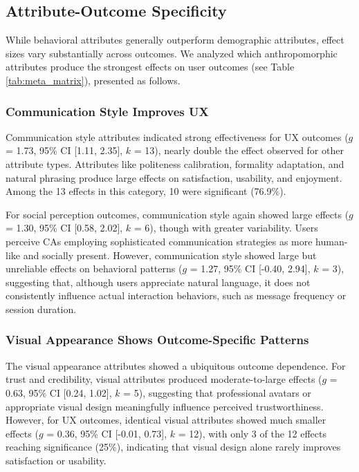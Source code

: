 \documentclass[sigconf,review,anonymous]{acmart}
\begin{document}
\subsection{Attribute-Outcome Specificity}

While behavioral attributes generally outperform demographic attributes, effect sizes vary substantially across outcomes. We analyzed which anthropomorphic attributes produce the strongest effects on user outcomes (see Table \ref{tab:meta_matrix}), presented as follows.

\subsubsection{Communication Style Improves UX}\label{sec:comm}

Communication style attributes indicated strong effectiveness for UX outcomes ($g$ = 1.73, 95\% CI [1.11, 2.35], $k$ = 13), nearly double the effect observed for other attribute types. Attributes like politeness calibration, formality adaptation, and natural phrasing produce large effects on satisfaction, usability, and enjoyment. Among the 13 effects in this category, 10 were significant (76.9\%).

For social perception outcomes, communication style again showed large effects ($g$ = 1.30, 95\% CI [0.58, 2.02], $k$ = 6), though with greater variability. Users perceive CAs employing sophisticated communication strategies as more human-like and socially present. However, communication style showed large but unreliable effects on behavioral patterns ($g$ = 1.27, 95\% CI [-0.40, 2.94], $k$ = 3), suggesting that, although users appreciate natural language, it does not consistently influence actual interaction behaviors, such as message frequency or session duration.

\subsubsection{Visual Appearance Shows Outcome-Specific Patterns}

The visual appearance attributes showed a ubiquitous outcome dependence. For trust and credibility, visual attributes produced moderate-to-large effects ($g$ = 0.63, 95\% CI [0.24, 1.02], $k$ = 5), suggesting that professional avatars or appropriate visual design meaningfully influence perceived trustworthiness. However, for UX outcomes, identical visual attributes showed much smaller effects ($g$ = 0.36, 95\% CI [-0.01, 0.73], $k$ = 12), with only 3 of the 12 effects reaching significance (25\%), indicating that visual design alone rarely improves satisfaction or usability.
\end{document}
